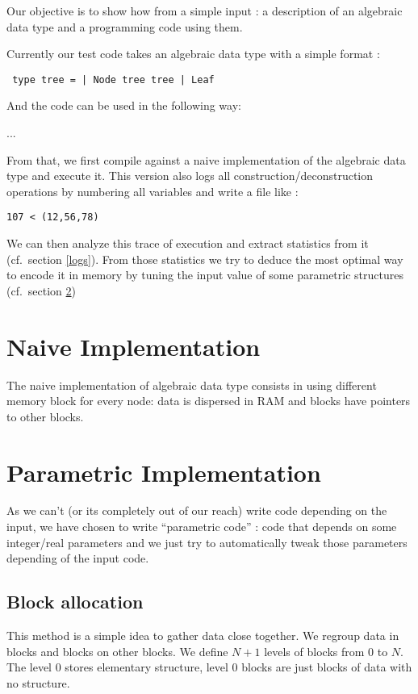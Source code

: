 \documentclass[12pt]{article}
\begin{document}
Our objective is to show how from a simple input : a description of an algebraic
data type and a programming code using them.

Currently our test code takes an algebraic data type with a simple format :

\verb$ type tree = | Node tree tree | Leaf$

And the code can be used in the following way:

...

From that, we first compile against a naive implementation of the algebraic data type
and execute it. This version also logs all construction/deconstruction operations by
numbering all variables and write a file like :

\verb$107 < (12,56,78)$

We can then analyze this trace of execution and extract statistics from it (cf.\ 
section \ref{logs}). From
those statistics we try to deduce the most optimal way to encode it in memory by
tuning the input value of some parametric structures (cf.\ section \ref{paramImplem})




\section{Naive Implementation}

The naive implementation of algebraic data type consists in using different memory
block for every node: data is dispersed in RAM and blocks have pointers to
other blocks.



\section{Parametric Implementation}
\label{paramImplem}

As we can't (or its completely out of our reach) write code
depending on the input, we have chosen to write ``parametric code'' : code that
depends on some integer/real parameters and we just try to automatically tweak
those parameters depending of the input code.

\subsection{Block allocation}

This method is a simple idea to gather data close together. We regroup data in
blocks and blocks on other blocks. We define $N +1$ levels of blocks from 0 to
$N$. The level $0$ stores elementary structure, level $0$ blocks are just blocks of
data with no structure.
\end{document}
